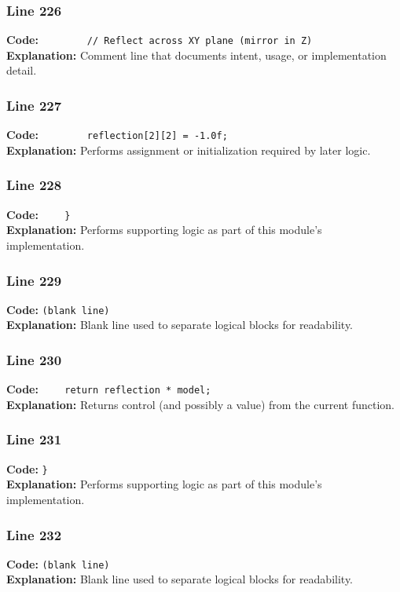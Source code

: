 \documentclass[11pt,a4paper]{article}
\begin{document}
\subsubsection*{Line 226}
\textbf{Code:} \verb|        // Reflect across XY plane (mirror in Z)|\\
\textbf{Explanation:} Comment line that documents intent, usage, or implementation detail.

\subsubsection*{Line 227}
\textbf{Code:} \verb|        reflection[2][2] = -1.0f;|\\
\textbf{Explanation:} Performs assignment or initialization required by later logic.

\subsubsection*{Line 228}
\textbf{Code:} \verb|    }|\\
\textbf{Explanation:} Performs supporting logic as part of this module's implementation.

\subsubsection*{Line 229}
\textbf{Code:} \texttt{(blank line)}\\
\textbf{Explanation:} Blank line used to separate logical blocks for readability.

\subsubsection*{Line 230}
\textbf{Code:} \verb|    return reflection * model;|\\
\textbf{Explanation:} Returns control (and possibly a value) from the current function.

\subsubsection*{Line 231}
\textbf{Code:} \verb|}|\\
\textbf{Explanation:} Performs supporting logic as part of this module's implementation.

\subsubsection*{Line 232}
\textbf{Code:} \texttt{(blank line)}\\
\textbf{Explanation:} Blank line used to separate logical blocks for readability.
\end{document}
